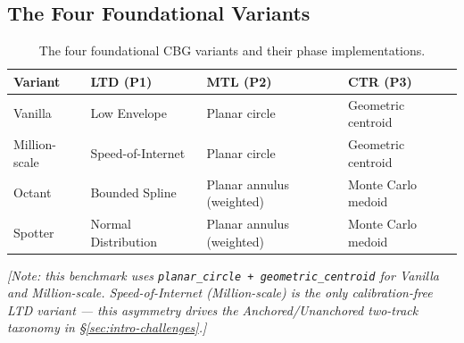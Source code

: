 \subsection{The Four Foundational Variants}
\label{sec:background-variants}

\begin{table}[h]
\caption{The four foundational CBG variants and their phase implementations.}
\label{tab:variants}
\begin{tabular}{llll}
\hline
\textbf{Variant} & \textbf{LTD (P1)} & \textbf{MTL (P2)} & \textbf{CTR (P3)} \\
\hline
Vanilla       & Low Envelope    & Planar circle             & Geometric centroid \\
Million-scale & Speed-of-Internet & Planar circle           & Geometric centroid \\
Octant        & Bounded Spline  & Planar annulus (weighted) & Monte Carlo medoid \\
Spotter       & Normal Distribution & Planar annulus (weighted) & Monte Carlo medoid \\
\hline
\end{tabular}
\end{table}

\textit{[Note: this benchmark uses \texttt{planar\_circle + geometric\_centroid} for Vanilla and
Million-scale. Speed-of-Internet (Million-scale) is the only calibration-free LTD variant — this
asymmetry drives the Anchored/Unanchored two-track taxonomy in \S\ref{sec:intro-challenges}.]}
